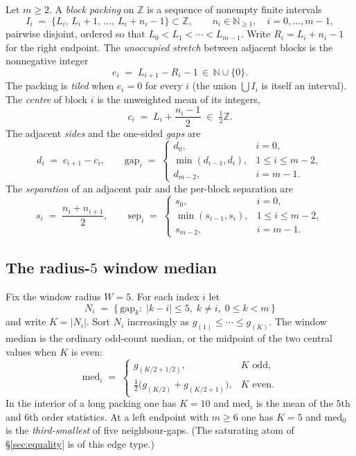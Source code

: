 \documentclass[11pt]{article}
\theoremstyle{remark}
\newcommand{\N}{\mathbb{N}}
\newcommand{\Z}{\mathbb{Z}}
\begin{document}
Let $m\ge 2$.  A \emph{block packing} on $\Z$ is a sequence of
nonempty finite intervals
\[
I_i \;=\; \{L_i,\,L_i+1,\,\dots,\,L_i+n_i-1\}
\subset\Z,
\qquad n_i\in\N_{\ge 1},\quad i=0,\dots,m-1,
\]
pairwise disjoint, ordered so that $L_0<L_1<\cdots<L_{m-1}$.
Write $R_i=L_i+n_i-1$ for the right endpoint.  The
\emph{unoccupied stretch} between adjacent blocks is the nonnegative
integer
\[
e_i \;=\; L_{i+1}-R_i-1 \,\in\,\N\cup\{0\}.
\]
The packing is \emph{tiled} when $e_i=0$ for every $i$ (the union
$\bigcup I_i$ is itself an interval).  The \emph{centre} of block
$i$ is the unweighted mean of its integers,
\begin{equation}\label{eq:centre}
c_i \;=\; L_i+\frac{n_i-1}{2} \;\in\; \tfrac12\Z.
\end{equation}
The adjacent \emph{sides} and the one-sided \emph{gaps} are
\begin{equation}\label{eq:sides}
d_i \;=\; c_{i+1}-c_i,
\qquad
\mathrm{gap}_i \;=\;
\begin{cases}
d_0, & i=0,\\
\min(d_{i-1},d_i), & 1\le i\le m-2,\\
d_{m-2}, & i=m-1.
\end{cases}
\end{equation}
The \emph{separation} of an adjacent pair and the per-block
separation are
\begin{equation}\label{eq:sep}
s_i \;=\; \frac{n_i+n_{i+1}}{2},
\qquad
\mathrm{sep}_i \;=\;
\begin{cases}
s_0, & i=0,\\
\min(s_{i-1},s_i), & 1\le i\le m-2,\\
s_{m-2}, & i=m-1.
\end{cases}
\end{equation}

\subsection{The radius-$5$ window median}

Fix the window radius $W=5$.  For each index $i$ let
\[
N_i \;=\; \bigl\{\, \mathrm{gap}_k :\; |k-i|\le 5,\; k\neq i,\;
0\le k<m \,\bigr\}
\]
and write $K=|N_i|$.  Sort $N_i$ increasingly as
$g_{(1)}\le\cdots\le g_{(K)}$.  The window median is the ordinary
odd-count median, or the midpoint of the two central values when
$K$ is even:
\begin{equation}\label{eq:med}
\mathrm{med}_i \;=\;
\begin{cases}
g_{(K/2+1/2)}, & K\text{ odd},\\[1mm]
\tfrac12\bigl(g_{(K/2)}+g_{(K/2+1)}\bigr), & K\text{ even}.
\end{cases}
\end{equation}
In the interior of a long packing one has $K=10$ and $\mathrm{med}_i$
is the mean of the $5$th and $6$th order statistics.  At a left
endpoint with $m\ge 6$ one has $K=5$ and $\mathrm{med}_0$ is the
\emph{third-smallest} of five neighbour-gaps.  (The saturating atom
of \S\ref{sec:equality} is of this edge type.)
\end{document}
